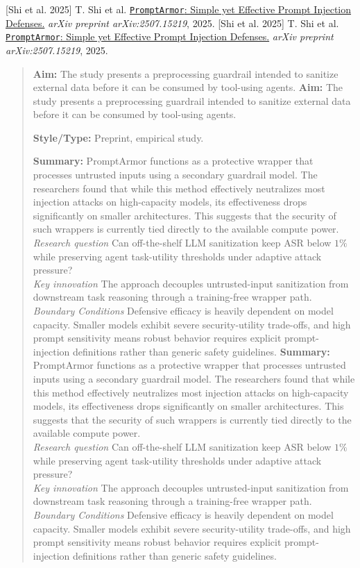 \documentclass[11pt, a4paper]{article}
\begin{document}
\newpage
\noindent \hypertarget{p5}{[Shi et al. 2025]} T. Shi et al. \href{https://arxiv.org/abs/2507.15219}{\texttt{PromptArmor}: Simple yet Effective Prompt Injection Defenses.} \textit{arXiv preprint arXiv:2507.15219}, 2025.
\noindent \hypertarget{p5}{[Shi et al. 2025]} T. Shi et al. \href{https://arxiv.org/abs/2507.15219}{\texttt{PromptArmor}: Simple yet Effective Prompt Injection Defenses.} \textit{arXiv preprint arXiv:2507.15219}, 2025.
\begin{quote}
\textbf{Aim:} The study presents a preprocessing guardrail intended to sanitize external data before it can be consumed by tool-using agents.
\textbf{Aim:} The study presents a preprocessing guardrail intended to sanitize external data before it can be consumed by tool-using agents.

\vspace{0.5em}
\textbf{Style/Type:} Preprint, empirical study.

\vspace{0.5em}
\textbf{Summary:} PromptArmor functions as a protective wrapper that processes untrusted inputs using a secondary guardrail model. The researchers found that while this method effectively neutralizes most injection attacks on high-capacity models, its effectiveness drops significantly on smaller architectures. This suggests that the security of such wrappers is currently tied directly to the available compute power. \\ \textit{Research question} Can off-the-shelf LLM sanitization keep ASR below $1\%$ while preserving agent task-utility thresholds under adaptive attack pressure? \\ \textit{Key innovation} The approach decouples untrusted-input sanitization from downstream task reasoning through a training-free wrapper path. \\ \textit{Boundary Conditions} Defensive efficacy is heavily dependent on model capacity. Smaller models exhibit severe security-utility trade-offs, and high prompt sensitivity means robust behavior requires explicit prompt-injection definitions rather than generic safety guidelines.
\textbf{Summary:} PromptArmor functions as a protective wrapper that processes untrusted inputs using a secondary guardrail model. The researchers found that while this method effectively neutralizes most injection attacks on high-capacity models, its effectiveness drops significantly on smaller architectures. This suggests that the security of such wrappers is currently tied directly to the available compute power. \\ \textit{Research question} Can off-the-shelf LLM sanitization keep ASR below $1\%$ while preserving agent task-utility thresholds under adaptive attack pressure? \\ \textit{Key innovation} The approach decouples untrusted-input sanitization from downstream task reasoning through a training-free wrapper path. \\ \textit{Boundary Conditions} Defensive efficacy is heavily dependent on model capacity. Smaller models exhibit severe security-utility trade-offs, and high prompt sensitivity means robust behavior requires explicit prompt-injection definitions rather than generic safety guidelines.


\end{quote}
\end{document}
